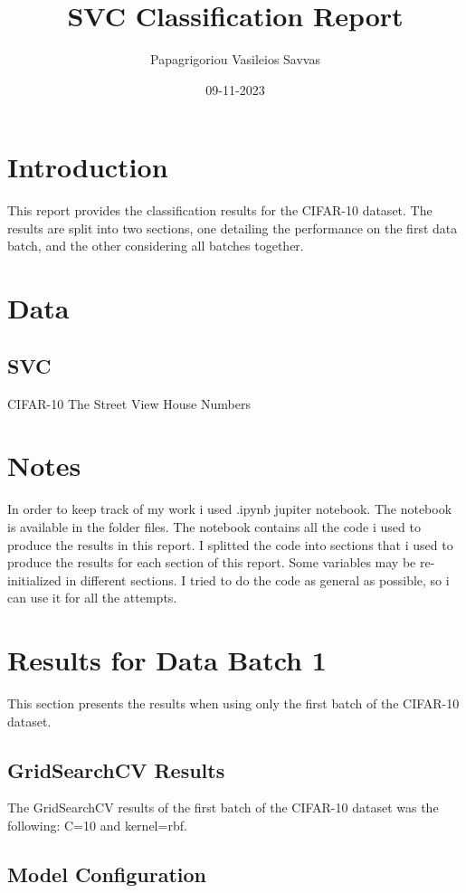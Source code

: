 \documentclass{article}
\title{\Huge SVC Classification Report}
\author{Papagrigoriou Vasileios Savvas}
\date{09-11-2023}
\begin{document}
\maketitle

\section*{Introduction}
This report provides the classification results for the CIFAR-10 dataset. The results are split into two sections, one detailing the performance on the first data batch, and the other considering all batches together.

\section*{Data}
\subsection*{SVC}
CIFAR-10
The Street View House Numbers

\section*{Notes}
In order to keep track of my work i used .ipynb jupiter notebook.
The notebook is available in the folder files.
The notebook contains all the code i used to produce the results in this report.
I splitted the code into sections that i used to produce the results for each section of this report.
Some variables may be re-initialized in different sections.
I tried to do the code as general as possible, so i can use it for all the attempts.

\section{Results for Data Batch 1}
This section presents the results when using only the first batch of the CIFAR-10 dataset.

\subsection*{GridSearchCV Results}
The GridSearchCV results of the first batch of the CIFAR-10 dataset was the following: C=10 and kernel=rbf.

\subsection*{Model Configuration}
\end{document}
